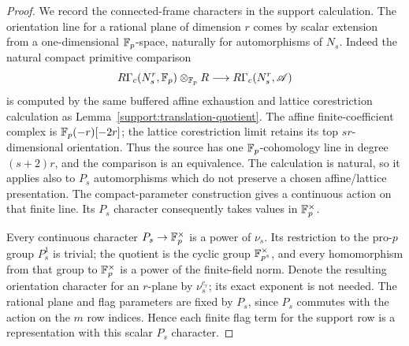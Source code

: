 \begin{proof}
We record the connected-frame characters in the support calculation.
The orientation line for a rational plane of dimension $r$ comes
by scalar extension from a one-dimensional $\mathbb F_p$-space, naturally
for automorphisms of $N_s$.
Indeed the natural compact primitive comparison
\[
 R\Gamma_c(N_s^r,\mathbb F_p)\otimes_{\mathbb F_p}R
       \longrightarrow R\Gamma_c(N_s^r,\mathscr A)
\]
is computed by the same buffered affine exhaustion and lattice
corestriction calculation as
Lemma~\ref{support:translation-quotient}.
The affine finite-coefficient complex is $\mathbb F_p(-r)[-2r]$;
the lattice corestriction limit retains its top
$sr$-dimensional orientation.
Thus the source has one $\mathbb F_p$-cohomology line in degree
$(s+2)r$, and the comparison is an equivalence.
The calculation is natural, so it applies also to $P_s$
automorphisms which do not preserve a chosen affine/lattice
presentation.
The compact-parameter construction gives a continuous action
on that finite line.  Its $P_s$ character consequently takes
values in $\mathbb F_p^\times$.

Every continuous character $P_s\to\mathbb F_p^\times$ is a power of
$\nu_s$.  Its restriction to the pro-$p$ group $P_s^1$ is
trivial; the quotient is the cyclic group
$\mathbb F_{p^s}^\times$, and every homomorphism from that group to
$\mathbb F_p^\times$ is a power of the finite-field norm.
Denote the resulting orientation character for an $r$-plane
by $\nu_s^{c_r}$; its exact exponent is not needed.
The rational plane and flag parameters are fixed by $P_s$,
since $P_s$ commutes with the action on the $m$ row indices.
Hence each finite flag term for the support row is a
representation with this scalar $P_s$ character.


\end{proof}
